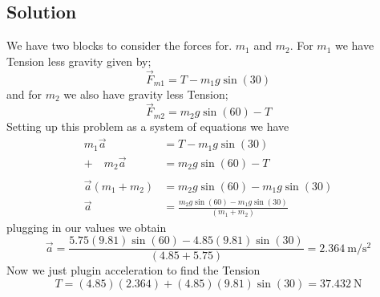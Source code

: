 \documentclass{article}
\begin{document}
\subsection*{Solution}
We have two blocks to consider the forces for. $m_1$ and $m_2$. For $m_1$ we have Tension less gravity given by;
\[
	\vec{F}_{m1} = T - m_1 g \sin(30)
\]
and for $m_2$ we also have gravity less Tension;
\[
	\vec{F}_{m2} = m_2 g \sin(60) - T
\]
Setting up this problem as a system of equations we have
\begin{align*}
	m_1 \vec{a} &= T - m_1 g \sin(30) \\
	+ \quad m_2 \vec{a} &= m_2 g \sin(60) - T\\
			    \\
	\vec{a}\left(m_1 + m_2\right) &= m_2 g \sin(60) - m_1 g \sin(30) \\
	\vec{a} &= \frac{m_2 g \sin(60) - m_1 g \sin(30)}{(m_1 + m_2)}
\end{align*}
plugging in our values we obtain
\[
	\vec{a} = \frac{5.75 (9.81) \sin(60) - 4.85 (9.81) \sin(30)}{(4.85 + 5.75)} =  \boxed{2.364\ \text{m}/\text{s}^2}
\]
Now we just plugin acceleration to find the Tension
\[
	T = (4.85) (2.364) + (4.85) (9.81) \sin(30) = \boxed{37.432\ \text{N}}
\]
\end{document}
